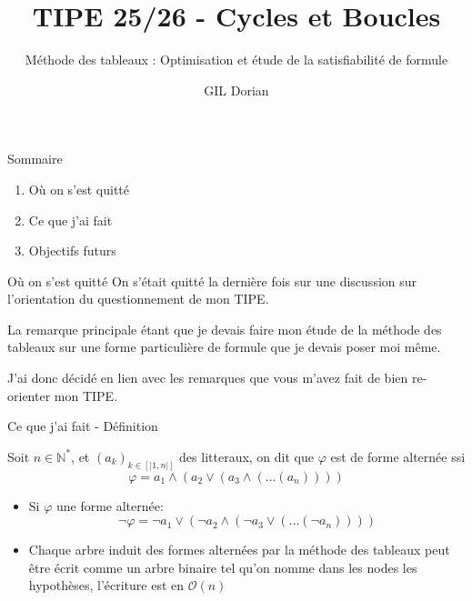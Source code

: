 \documentclass[]{beamer}
\title{TIPE 25/26 - Cycles et Boucles}
\author{GIL Dorian}
\subtitle{Méthode des tableaux : Optimisation et étude de la satisfiabilité de formule}
\date{}
\begin{document}
\begin{frame}
\titlepage
\end{frame}

\begin{frame}{Sommaire}
\begin{enumerate}
    \item Où on s'est quitté
    \item Ce que j'ai fait
    \item Objectifs futurs
\end{enumerate}
\end{frame}

\begin{frame}{Où on s'est quitté}
    On s'était quitté la dernière fois sur une discussion sur l'orientation du questionnement de mon TIPE.

    La remarque principale étant que je devais faire mon étude de la méthode des tableaux sur une forme particulière de formule que je devais poser moi même.

    J'ai donc décidé en lien avec les remarques que vous m'avez fait de bien re-orienter mon TIPE.
\end{frame}

\begin{frame}{Ce que j'ai fait - Définition}
    \begin{definition}
        Soit $n\in\mathbb{N}^*$, et $(a_k)_{k\in [|1,n|]}$ des litteraux, on dit que $\varphi$ est de forme alternée ssi
        $$\varphi = a_1\land(a_2\lor(a_3\land(\dots(a_n))))$$
    \end{definition}
    \pause
    \begin{theorem}
        \begin{itemize}
            \item Si $\varphi$ une forme alternée: $$\lnot\varphi = \lnot a_1\lor(\lnot a_2\land(\lnot a_3 \lor(\dots(\lnot a_n))))$$
            \item Chaque arbre induit des formes alternées par la méthode des tableaux peut être écrit comme un arbre binaire tel qu'on nomme dans les nodes les hypothèses, l'écriture est en $\mathcal{O}(n)$
        \end{itemize}
    \end{theorem}
\end{frame}
\end{document}
